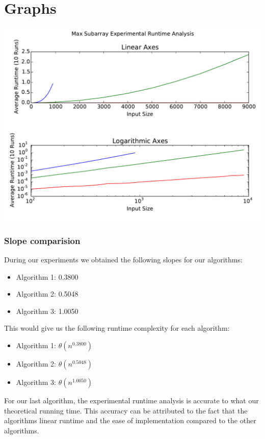 \documentclass{article}
\begin{document}
\section{Graphs}

\includegraphics[width=\textwidth]{timings}

\subsubsection*{Slope comparision}

During our experiments we obtained the following slopes for our algorithms:

\begin{itemize}
\item Algorithm 1: 0.3800
\item Algorithm 2: 0.5048
\item Algorithm 3: 1.0050
\end{itemize}

This would give us the following runtime complexity for each algorithm:

\begin{itemize}
    \item Algorithm 1: $\mathcal{\theta}(n^{0.3800})$
    \item Algorithm 2: $\mathcal{\theta}(n^{0.5048})$
    \item Algorithm 3: $\mathcal{\theta}(n^{1.0050})$
\end{itemize}

For our last algorithm, the experimental runtime analysis is accurate to what
our theoretical running time. This accuracy can be attributed to the fact that
the algorithms linear runtime and the ease of implementation compared to the
other algorithms.
\end{document}
